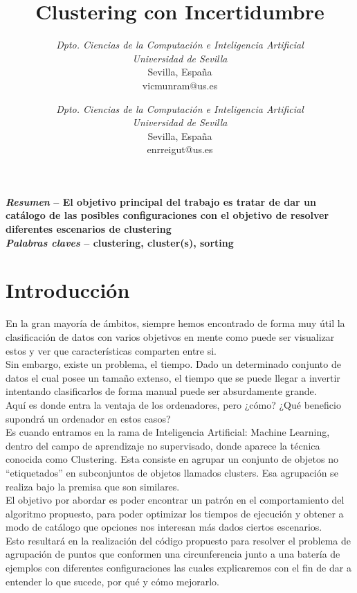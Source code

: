 \documentclass[conference,a4paper]{IEEEtran}
\title{Clustering con Incertidumbre}
\author
{
	\IEEEauthorblockN{Víctor Muñoz Ramírez}
	\IEEEauthorblockA
	{
		\textit{Dpto. Ciencias de la Computación e Inteligencia Artificial}\\
		\textit{Universidad de Sevilla}\\
		Sevilla, España\\
		vicmunram@us.es
	}
	\and	
	\IEEEauthorblockN{Enrique Reina Gutiérrez}
	\IEEEauthorblockA
	{
		\textit{Dpto. Ciencias de la Computación e Inteligencia Artificial}\\
		\textit{Universidad de Sevilla}\\
		Sevilla, España\\
		enrreigut@us.es
	}
}
\begin{document}
\maketitle


\textbf{\textit{Resumen} -- El objetivo principal del trabajo es tratar de dar un catálogo de las posibles configuraciones con el objetivo de resolver diferentes escenarios de clustering}\\

\textbf{\textit{Palabras claves} -- clustering, cluster(s), sorting}

\section{Introducción}

En la gran mayoría de ámbitos, siempre hemos encontrado de forma muy útil la clasificación de datos con varios objetivos en mente como puede ser visualizar estos y ver que características comparten entre si.\\

Sin embargo, existe un problema, el tiempo. Dado un determinado conjunto de datos el cual posee un tamaño extenso, el tiempo que se puede llegar a invertir intentando clasificarlos de forma manual puede ser absurdamente grande.\\

Aquí es donde entra la ventaja de los ordenadores, pero ¿cómo? ¿Qué beneficio supondrá un ordenador en estos casos? \\

Es cuando entramos en la rama de Inteligencia Artificial: Machine Learning, dentro del campo de aprendizaje no supervisado, donde aparece la técnica conocida como Clustering. Esta consiste en agrupar un conjunto de objetos no “etiquetados” en subconjuntos de objetos llamados clusters. Esa agrupación se realiza bajo la premisa que son similares.\\

El objetivo por abordar es poder encontrar un patrón en el comportamiento del algoritmo propuesto, para poder optimizar los tiempos de ejecución y obtener a modo de catálogo que opciones nos interesan más dados ciertos escenarios.\\

Esto resultará en la realización del código propuesto para resolver el problema de agrupación de puntos que conformen una circunferencia junto a una batería de ejemplos con diferentes configuraciones las cuales explicaremos con el fin de dar a entender lo que sucede, por qué y cómo mejorarlo.\\
\end{document}
